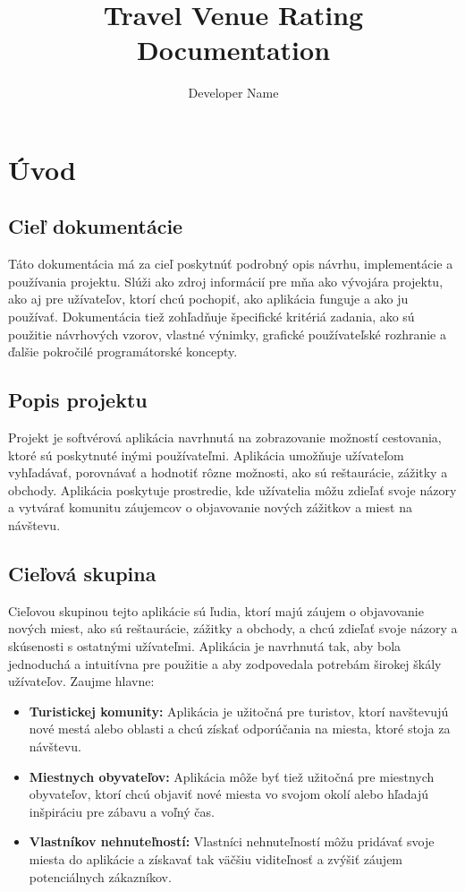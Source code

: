 \documentclass{article}
\title{Travel Venue Rating Documentation}
\author{Developer Name}
\date{}
\begin{document}
\maketitle
\tableofcontents
\section{Úvod}
\subsection{Cieľ dokumentácie}
Táto dokumentácia má za cieľ poskytnúť podrobný opis návrhu, implementácie a používania projektu. Slúži ako zdroj informácií pre mňa ako vývojára projektu, ako aj pre užívateľov, ktorí chcú pochopiť, ako aplikácia funguje a ako ju používať. Dokumentácia tiež zohľadňuje špecifické kritériá zadania, ako sú použitie návrhových vzorov, vlastné výnimky, grafické používateľské rozhranie a ďalšie pokročilé programátorské koncepty.

\subsection{Popis projektu}
Projekt je softvérová aplikácia navrhnutá na zobrazovanie možností cestovania, ktoré sú poskytnuté inými používateľmi. Aplikácia umožňuje užívateľom vyhľadávať, porovnávať a hodnotiť rôzne možnosti, ako sú reštaurácie, zážitky a obchody. Aplikácia poskytuje prostredie, kde užívatelia môžu zdieľať svoje názory a vytvárať komunitu záujemcov o objavovanie nových zážitkov a miest na návštevu.

\subsection{Cieľová skupina}
Cieľovou skupinou tejto aplikácie sú ľudia, ktorí majú záujem o objavovanie nových miest, ako sú reštaurácie, zážitky a obchody, a chcú zdieľať svoje názory a skúsenosti s ostatnými užívateľmi. Aplikácia je navrhnutá tak, aby bola jednoduchá a intuitívna pre použitie a aby zodpovedala potrebám širokej škály užívateľov. Zaujme hlavne:
\begin{itemize}
    \item \textbf{Turistickej komunity:} Aplikácia je užitočná pre turistov, ktorí navštevujú nové mestá alebo oblasti a chcú získať odporúčania na miesta, ktoré stoja za návštevu. 
    
    \item \textbf{Miestnych obyvateľov:} Aplikácia môže byť tiež užitočná pre miestnych obyvateľov, ktorí chcú objaviť nové miesta vo svojom okolí alebo hľadajú inšpiráciu pre zábavu a voľný čas.
    
    \item \textbf{Vlastníkov nehnuteľností:} Vlastníci nehnuteľností môžu pridávať svoje miesta do aplikácie a získavať tak väčšiu viditeľnosť a zvýšiť záujem potenciálnych zákazníkov.
\end{itemize}
\end{document}
